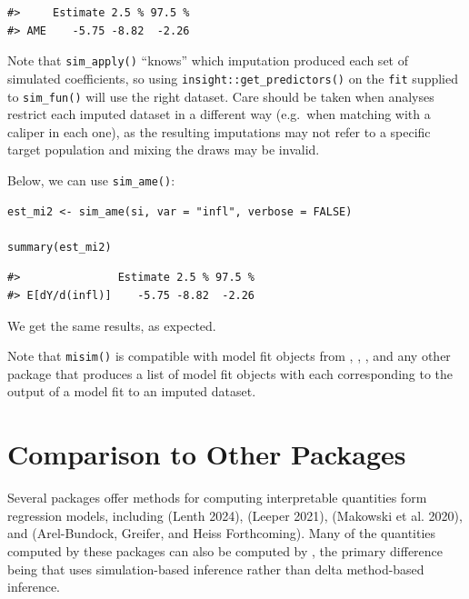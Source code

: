 \begin{verbatim}
#>     Estimate 2.5 % 97.5 %
#> AME    -5.75 -8.82  -2.26
\end{verbatim}

Note that \texttt{sim\_apply()} ``knows'' which imputation produced each set of simulated coefficients, so using \texttt{insight::get\_predictors()} on the \texttt{fit} supplied to \texttt{sim\_fun()} will use the right dataset. Care should be taken when analyses restrict each imputed dataset in a different way (e.g.~when matching with a caliper in each one), as the resulting imputations may not refer to a specific target population and mixing the draws may be invalid.

Below, we can use \texttt{sim\_ame()}:

\begin{verbatim}
est_mi2 <- sim_ame(si, var = "infl", verbose = FALSE)

summary(est_mi2)
\end{verbatim}

\begin{verbatim}
#>               Estimate 2.5 % 97.5 %
#> E[dY/d(infl)]    -5.75 -8.82  -2.26
\end{verbatim}

We get the same results, as expected.

Note that \texttt{misim()} is compatible with model fit objects from , , , and any other package that produces a list of model fit objects with each corresponding to the output of a model fit to an imputed dataset.

\hypertarget{comparison-to-other-packages}{%
\section{Comparison to Other Packages}\label{comparison-to-other-packages}}

Several packages offer methods for computing interpretable quantities form regression models, including  (Lenth 2024),  (Leeper 2021),  (Makowski et al. 2020), and  (Arel-Bundock, Greifer, and Heiss Forthcoming). Many of the quantities computed by these packages can also be computed by , the primary difference being that  uses simulation-based inference rather than delta method-based inference.

